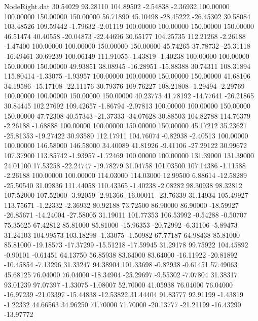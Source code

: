 \begin{filecontents}{NodeRight.dat}
  30.54029   93.28110  104.89502    -2.54838   -2.36932  100.00000  100.00000  150.00000  150.00000   56.71890   45.10498  -28.45222  -26.45302
  30.58084  103.48526  109.59442    -1.79632   -2.01119  100.00000  100.00000  150.00000  150.00000   46.51474   40.40558  -20.04873  -22.44696
  30.65177  104.25735  112.21268    -2.26188   -1.47400  100.00000  100.00000  150.00000  150.00000   45.74265   37.78732  -25.31118  -16.49461
  30.69239  100.06149  111.91055    -1.43819   -1.40238  100.00000  100.00000  150.00000  150.00000   49.93851   38.08945  -16.28951  -15.88388
  30.74311  108.31894  115.80414    -1.33075   -1.93957  100.00000  100.00000  150.00000  150.00000   41.68106   34.19586  -15.17108  -22.11176
  30.79376  109.76227  108.21808    -1.29494   -2.29769  100.00000  100.00000  150.00000  150.00000   40.23773   41.78192  -14.77641  -26.21865
  30.84445  102.27692  109.42657    -1.86794   -2.97813  100.00000  100.00000  150.00000  150.00000   47.72308   40.57343  -21.37333  -34.07628
  30.88503  104.82788  114.76379    -2.26188   -1.68888  100.00000  100.00000  150.00000  150.00000   45.17212   35.23621  -25.81353  -19.27422
  30.93580  112.17911  104.76074    -0.82938   -2.40513  100.00000  100.00000  146.58000  146.58000   34.40089   41.81926   -9.41106  -27.29122
  30.99672  107.37900  113.85742    -1.93957   -1.72469  100.00000  100.00000  131.39000  131.39000   24.01100   17.53258  -22.24747  -19.78279
  31.04758  101.03500  107.14386    -1.11588   -2.26188  100.00000  100.00000  114.03000  114.03000   12.99500    6.88614  -12.58289  -25.50540
  31.09836  111.44058  110.43365    -1.40238   -2.08282   98.30938   98.32812  107.52000  107.52000   -3.92059   -2.91366  -16.00011  -23.76339
  31.14934  105.49927  113.75671    -1.22332   -2.36932   80.92188   73.72500   86.90000   86.90000  -18.59927  -26.85671  -14.24004  -27.58005
  31.19011  101.77353  106.53992    -0.54288   -0.50707   75.35625   67.42812   85.81000   85.81000  -15.96353  -20.72992   -6.31106   -5.89473
  31.24103  104.99573  103.18298    -1.33075   -1.50982   67.77187   64.98438   85.81000   85.81000  -19.18573  -17.37299  -15.51218  -17.59945
  31.29178   99.75922  104.45892    -0.90101   -0.61451   64.13750   56.85938   83.64000   83.64000  -16.11922  -20.81892  -10.45854   -7.13296
  31.33247   94.38904  101.33698    -0.82938   -0.61451   57.49063   45.68125   76.04000   76.04000  -18.34904  -25.29697   -9.55302   -7.07804
  31.38317   93.01239   97.07397    -1.33075   -1.08007   52.70000   41.05938   76.04000   76.04000  -16.97239  -21.03397  -15.44838  -12.53822
  31.44404   91.83777   92.91199    -1.43819   -1.22332   44.66563   34.96250   71.70000   71.70000  -20.13777  -21.21199  -16.43290  -13.97772

\end{filecontents}
